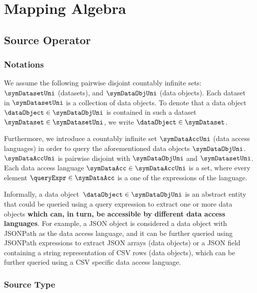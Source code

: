 \section{Mapping Algebra}%
\label{sec:mapping_algebra}

\subsection{Source Operator}%
\label{sub:source_operator}

\subsubsection{Notations}%
\label{ssub:source_notations}


We assume the following pairwise disjoint countably infinite sets:
$\symDatasetUni$ (datasets), and  $\symDataObjUni$ (data objects).
Each dataset in $\symDatasetUni$ is a collection of data objects.
To denote that a data object~$\dataObject \in \symDataObjUni$ is contained in
such a dataset~$\symDataset \in \symDatasetUni$, we write
$\dataObject \in \symDataset$.

Furthermore, we introduce a countably infinite set $\symDataAccUni$ (data
access languages) in order to query the aforementioned data objects $\symDataObjUni$.
$\symDataAccUni$ is pairwise disjoint with $\symDataObjUni$ and $\symDatasetUni$.
Each data access language  $\symDataAcc \in \symDataAccUni$ is a set, where
every element $\queryExpr \in \symDataAcc$ is a one of the expressions of the
language.


Informally, a data object~$\dataObject \in \symDataObjUni$ is an abstract
entity that could be queried using a query expression to extract
one or more data objects \textbf{which can, in turn, be accessible by different data access languages}.
For example, a JSON object is considered a data object with JSONPath as the data
access language, and it can be further queried using JSONPath expressions to
extract JSON arrays (data objects) or a JSON field containing a string
representation of CSV rows (data objects), which can be further queried using a CSV specific
data access language.





\subsubsection{Source Type}%
\label{ssub:source_type}

